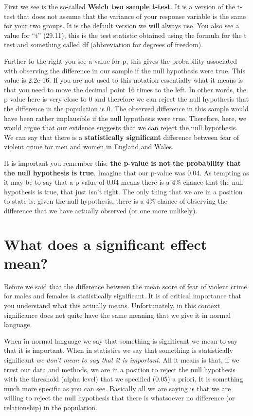 \documentclass[
]{book}
\begin{document}
First we see is the so-called \textbf{Welch two sample t-test}. It is a version of the t-test that does not assume that the variance of your response variable is the same for your two groups. It is the default version we will always use. You also see a value for ``t'' (29.11), this is the test statistic obtained using the formula for the t test and something called df (abbreviation for degrees of freedom).

Farther to the right you see a value for p, this gives the probability associated with observing the difference in our sample if the null hypothesis were true. This value is 2.2e-16. If you are not used to this notation essentially what it means is that you need to move the decimal point 16 times to the left. In other words, the p value here is very close to 0 and therefore we can reject the null hypothesis that the difference in the population is 0. The observed difference in this sample would have been rather implausible if the null hypothesis were true. Therefore, here, we would argue that our evidence suggests that we can reject the null hypothesis. We can say that there is a \textbf{statistically significant} difference between fear of violent crime for men and women in England and Wales.

It is important you remember this: \textbf{the p-value is not the probability that the null hypothesis is true}. Imagine that our p-value was 0.04. As tempting as it may be to say that a p-value of 0.04 means there is a 4\% chance that the null hypothesis is true, that just isn't right. The only thing that we are in a position to state is: given the null hypothesis, there is a 4\% chance of observing the difference that we have actually observed (or one more unlikely).

\section{What does a significant effect mean?}\label{what-does-a-significant-effect-mean}

Before we said that the difference between the mean score of fear of violent crime for males and females is statistically significant. It is of critical importance that you understand what this actually means. Unfortunately, in this context significance does not quite have the same meaning that we give it in normal language.

When in normal language we say that something is significant we mean to say that it is important. When in statistics we say that something is statistically significant \emph{we don't mean to say that it is important}. All it means is that, if we trust our data and methods, we are in a position to reject the null hypothesis with the threshold (alpha level) that we specified (0.05) a priori. It is something much more specific as you can see. Basically all we are saying is that we are willing to reject the null hypothesis that there is whatsoever no difference (or relationship) in the population.
\end{document}
